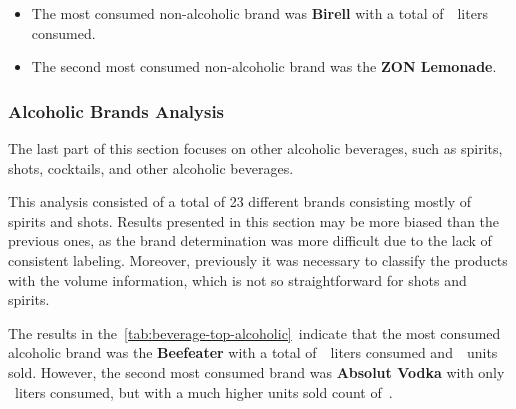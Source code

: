 \begin{keytakeaways}
	\begin{itemize}
		\item The most consumed non-alcoholic brand was \textbf{Birell} with a total of~~liters consumed.
		\item The second most consumed non-alcoholic brand was the \textbf{ZON Lemonade}.
	\end{itemize}
\end{keytakeaways}


\subsubsection{Alcoholic Brands Analysis}
\label{subsubsec:analysis-beverage-popular-alcoholic}

The last part of this section focuses on other alcoholic beverages, such as spirits, shots, cocktails, and other alcoholic beverages.


This analysis consisted of a total of 23 different brands consisting mostly of spirits and shots.
Results presented in this section may be more biased than the previous ones, as the brand determination was more difficult due to the lack of consistent labeling.
Moreover, previously it was necessary to classify the products with the volume information, which is not so straightforward for shots and spirits.

The results in the~\autoref{tab:beverage-top-alcoholic}~indicate that the most consumed alcoholic brand was the \textbf{Beefeater} with a total of~~liters consumed and~~units sold.
However, the second most consumed brand was \textbf{Absolut Vodka} with only ~liters consumed, but with a much higher units sold count of~.

